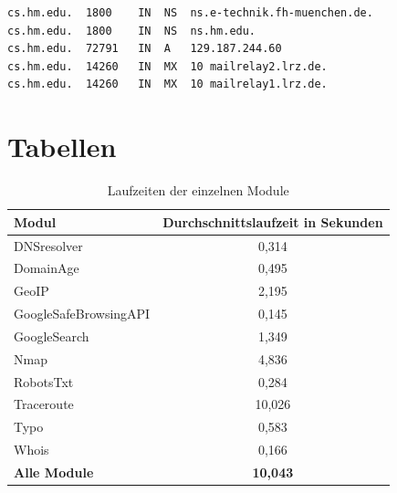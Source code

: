 \vspace{6mm}
\begin{lstlisting}[caption=DNS Auflösung von cs.hm.edu, label=lst.dnsDig, ]
cs.hm.edu.	1800	IN	NS	ns.e-technik.fh-muenchen.de.
cs.hm.edu.	1800	IN	NS	ns.hm.edu.
cs.hm.edu.	72791	IN	A   129.187.244.60
cs.hm.edu.	14260	IN	MX	10 mailrelay2.lrz.de.
cs.hm.edu.	14260	IN	MX	10 mailrelay1.lrz.de.
\end{lstlisting}


\chapter{Tabellen}

\begin{table}
	\begin{center}
		\begin{tabular}{ l c }
			\toprule
			\textbf{Modul} & \textbf{Durchschnittslaufzeit in Sekunden}\\
			\midrule   
			DNSresolver            & 0,314 \\
			DomainAge               & 0,495 \\
			GeoIP                   & 2,195 \\
			GoogleSafeBrowsingAPI   & 0,145 \\
			GoogleSearch            & 1,349 \\
			Nmap                    & 4,836 \\
			RobotsTxt               & 0,284 \\
			Traceroute              & 10,026 \\
			Typo                    & 0,583 \\
			Whois                   & 0,166 \\
			\midrule
			\textbf{Alle Module}    & \textbf{10,043} \\
			\bottomrule
		\end{tabular}
		\caption{Laufzeiten der einzelnen Module}\label{tab.laufzeit}
	\end{center}
\end{table}


